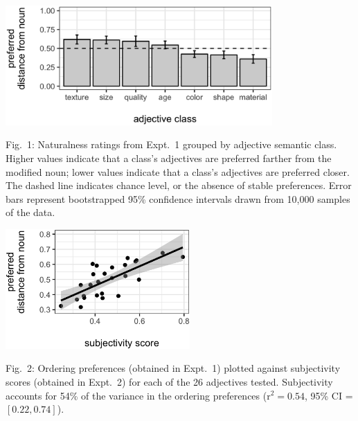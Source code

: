 \documentclass[10pt]{article}
\begin{document}
\noindent\begin{minipage}[t]{.56\textwidth}
	\begin{center}\includegraphics[height=1.8in]{../../experiments/2-tagalog-preference/results/LSA-class-distance.eps}
		\end{center}
	\vspace{-10pt}
	Fig.~1: Naturalness ratings from Expt.~1 grouped by adjective semantic class. Higher values indicate that a class's adjectives are preferred farther from the modified noun; lower values indicate that a class's adjectives are preferred closer. The dashed line indicates chance level, or the absence of stable preferences. Error bars represent bootstrapped 95\% confidence intervals drawn from 10,000 samples of the data.
	\end{minipage}
\hspace{10pt}
\begin{minipage}[t]{.4\textwidth}
	\begin{center}\includegraphics[height=1.8in]{../../experiments/2-tagalog-preference/results/LSA-naturalness-subjectivity.eps}
		\end{center}
	\vspace{-10pt}
	Fig.~2: Ordering preferences (obtained in Expt.~1) plotted against subjectivity scores (obtained in Expt.~2) for each of the 26 adjectives tested. Subjectivity accounts for 54\% of the variance in the ordering preferences (r$^2 = 0.54$, 95\% CI = $[0.22,0.74]$).
\end{minipage}
\end{document}
